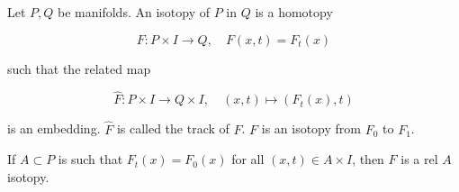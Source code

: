 Let $P, Q$ be manifolds. An isotopy of $P$ in $Q$ is a homotopy

$$F: P \times I \rightarrow Q, \quad F(x,t) = F_t(x)$$

such that the related map

$$\hat{F}: P \times I \rightarrow Q \times I, \quad (x,t) \mapsto (F_t(x),t)$$

is an embedding. $\hat{F}$ is called the track of $F$. $F$ is an isotopy from $F_0$ to $F_1$.

If $A \subset P$ is such that $F_t(x) = F_0(x)$ for all $(x,t) \in A \times I$, then $F$ is a rel $A$ isotopy.
